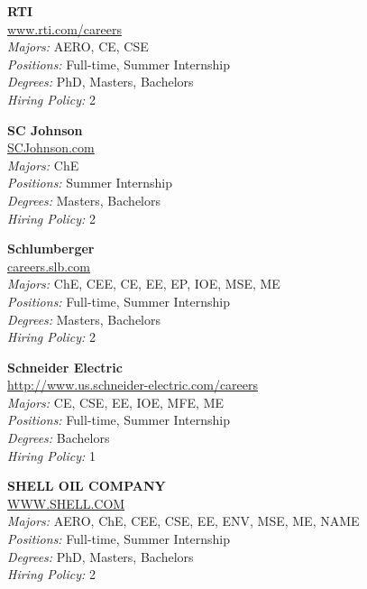 \documentclass{article}
\begin{document}
\begin{center}
\begin{multicols}{3}
\begin{minipage}{.9\columnwidth}{\Large\bf RTI }\\
	\url{www.rti.com/careers}\\
	\emph{Majors:} AERO, CE, CSE\\
	\emph{Positions:} Full-time, Summer Internship\\
	\emph{Degrees:} PhD, Masters, Bachelors\\
	\emph{Hiring Policy:} 2\\
\end{minipage}
 
\begin{minipage}{.9\columnwidth}{\Large\bf SC Johnson }\\
	\url{SCJohnson.com}\\
	\emph{Majors:} ChE\\
	\emph{Positions:} Summer Internship\\
	\emph{Degrees:} Masters, Bachelors\\
	\emph{Hiring Policy:} 2\\
\end{minipage}
 
\begin{minipage}{.9\columnwidth}{\Large\bf Schlumberger }\\
	\url{careers.slb.com}\\
	\emph{Majors:} ChE, CEE, CE, EE, EP, IOE, MSE, ME\\
	\emph{Positions:} Full-time, Summer Internship\\
	\emph{Degrees:} Masters, Bachelors\\
	\emph{Hiring Policy:} 2\\
\end{minipage}
 
\begin{minipage}{.9\columnwidth}{\Large\bf Schneider Electric }\\
	\url{http://www.us.schneider-electric.com/careers}\\
	\emph{Majors:} CE, CSE, EE, IOE, MFE, ME\\
	\emph{Positions:} Full-time, Summer Internship\\
	\emph{Degrees:} Bachelors\\
	\emph{Hiring Policy:} 1\\
\end{minipage}
 
\begin{minipage}{.9\columnwidth}{\Large\bf SHELL OIL COMPANY }\\
	\url{WWW.SHELL.COM}\\
	\emph{Majors:} AERO, ChE, CEE, CSE, EE, ENV, MSE, ME, NAME\\
	\emph{Positions:} Full-time, Summer Internship\\
	\emph{Degrees:} PhD, Masters, Bachelors\\
	\emph{Hiring Policy:} 2\\
\end{minipage}
 

\end{multicols}
\end{center}
\end{document}
